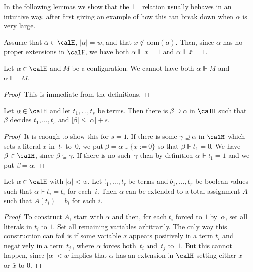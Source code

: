 In the following lemmas we show that the $\Vdash$ relation usually
behaves in an intuitive way, after first giving an example of how this can
break down when $\alpha$ is very large.

\begin{example}
Assume that $\alpha \in \calH$, $|\alpha| = w$, and that $x \notin \mathrm{dom}(\alpha)$.
Then, since $\alpha$ has no proper extensions in $\calH$,
we have both $\alpha \Vdash x = 1$ and $\alpha \Vdash \bar x = 1$. 
\end{example}

\begin{lemma}\label{lem:contrforce} 
Let $\alpha\in \calH$ and $M$ be a configuration. 
We cannot have both $\alpha\Vdash M$ and  $\alpha \Vdash \neg M$.
\end{lemma}

\begin{proof}
This is immediate from the definitions.
\end{proof}

\begin{lemma} \label{lem:extend_to_decide}
Let $\alpha \in \calH$ and let $t_1, \dots, t_s$ be terms.
Then there is  $\beta \supseteq \alpha$ in $\calH$ such that $\beta$ 
decides $t_1, \dots, t_s$ and $|\beta| \le |\alpha|+s$.
\end{lemma}

\begin{proof}
It is enough to show this for $s=1$.
If there is some $\gamma \supseteq \alpha$ in $\calH$ which sets a literal $x$ in~$t_1$
to~$0$, we put $\beta = \alpha \cup \{ x := 0 \}$ so that
$\beta \Vdash t_{1}=0$. We have $\beta \in \calH$, since $\beta \subseteq \gamma$.
If there is no such~$\gamma$ then by definition
$\alpha \Vdash t_1=1$ and we put $\beta = \alpha$.
\end{proof}

\begin{lemma} \label{lem:forcing_to_total_assignment}
Let $\alpha \in \calH$ with $|\alpha|<w$.
Let $t_1, \dots, t_r$ be terms and $b_1, \dots, b_r$
be boolean values such that $\alpha \Vdash t_i= b_i$ for each~$i$.
Then $\alpha$ can be extended to a total assignment $A$
such that $A(t_i) = b_i$ for each $i$.
\end{lemma}

\begin{proof}
To construct $A$, start with $\alpha$ and then, 
for each $t_i$ forced to $1$ by~$\alpha$, set all literals in $t_i$ to $1$. 
Set all remaining variables arbitrarily.
The only way this construction can fail is if some 
variable $x$ appears positively in a term $t_i$
and negatively in a term $t_j$\,, where $\alpha$ forces
both~$t_i$ and~$t_j$ to~$1$.
But this cannot happen, since $|\alpha|<w$ implies that $\alpha$
has an extension in $\calH$
setting either $x$ or $\bar x$ to $0$.
\end{proof}

